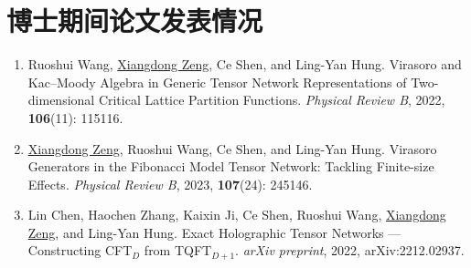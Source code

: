 \chapter{博士期间论文发表情况}

\begin{enumerate}[leftmargin=1.2em]
  \item Ruoshui Wang, \underline{Xiangdong Zeng}, Ce Shen, and Ling-Yan Hung.
    Virasoro and Kac--Moody Algebra in Generic Tensor Network Representations of Two-dimensional Critical Lattice Partition Functions.
    \emph{Physical Review B}, 2022, \textbf{106}\allowbreak (11): 115116.
  \item \underline{Xiangdong Zeng}, Ruoshui Wang, Ce Shen, and Ling-Yan Hung.
    Virasoro Generators in the Fibonacci Model Tensor Network: Tackling Finite-size Effects.
    \emph{Physical Review B}, 2023, \textbf{107}\allowbreak (24): 245146.
  \item Lin Chen, Haochen Zhang, Kaixin Ji, Ce Shen, Ruoshui Wang, \underline{Xiangdong Zeng}, and Ling-Yan Hung.
    Exact Holographic Tensor Networks --- Constructing CFT$_D$ from TQFT$_{D+1}$.
    \emph{arXiv preprint}, 2022, arXiv:2212.02937.
\end{enumerate}
